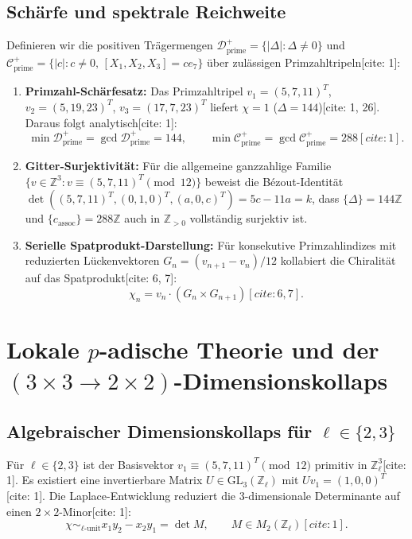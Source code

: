 \documentclass[11pt,a4paper]{article}
\theoremstyle{definition}
\theoremstyle{remark}
\begin{document}
\subsection{Schärfe und spektrale Reichweite}
Definieren wir die positiven Trägermengen $\mathcal{D}_{\mathrm{prime}}^{+} = \{|\Delta| : \Delta \neq 0\}$ und $\mathcal{C}_{\mathrm{prime}}^{+} = \{|c| : c \neq 0, \, [X_1,X_2,X_3]=ce_7\}$ über zulässigen Primzahltripeln[cite: 1]:
\begin{enumerate}
\item \textbf{Primzahl-Schärfesatz:} Das Primzahltripel $v_1=(5,7,11)^T$, $v_2=(5,19,23)^T$, $v_3=(17,7,23)^T$ liefert $\chi = 1$ ($\Delta = 144$)[cite: 1, 26]. Daraus folgt analytisch[cite: 1]:
\begin{equation}
\min \mathcal{D}_{\mathrm{prime}}^{+} = \gcd \mathcal{D}_{\mathrm{prime}}^{+} = 144, \qquad \min \mathcal{C}_{\mathrm{prime}}^{+} = \gcd \mathcal{C}_{\mathrm{prime}}^{+} = 288[cite: 1].
\end{equation}
\item \textbf{Gitter-Surjektivität:} Für die allgemeine ganzzahlige Familie $\{v \in \mathbb{Z}^3 : v \equiv (5,7,11)^T \pmod{12}\}$ beweist die Bézout-Identität $\det((5,7,11)^T, (0,1,0)^T, (a,0,c)^T) = 5c - 11a = k$, dass $\{\Delta\} = 144\mathbb{Z}$ und $\{c_{\mathrm{assoc}}\} = 288\mathbb{Z}$ auch in $\mathbb{Z}_{>0}$ vollständig surjektiv ist.
\item \textbf{Serielle Spatprodukt-Darstellung:} Für konsekutive Primzahlindizes mit reduzierten Lückenvektoren $G_n = (v_{n+1}-v_n)/12$ kollabiert die Chiralität auf das Spatprodukt[cite: 6, 7]:
\begin{equation}
\boxed{\chi_n = v_n \cdot (G_n \times G_{n+1})}[cite: 6, 7].
\end{equation}
\end{enumerate}

\section{Lokale $p$-adische Theorie und der $(3\times 3 \to 2\times 2)$-Dimensionskollaps}

\subsection{Algebraischer Dimensionskollaps für $\ell \in \{2, 3\}$}
Für $\ell \in \{2, 3\}$ ist der Basisvektor $v_1 \equiv (5, 7, 11)^T \pmod{12}$ primitiv in $\mathbb{Z}_\ell^3$[cite: 1]. Es existiert eine invertierbare Matrix $U \in \mathrm{GL}_3(\mathbb{Z}_\ell)$ mit $U v_1 = (1, 0, 0)^T$[cite: 1]. Die Laplace-Entwicklung reduziert die 3-dimensionale Determinante auf einen $2\times 2$-Minor[cite: 1]:
\begin{equation}
\chi \sim_{\ell\text{-unit}} x_1 y_2 - x_2 y_1 = \det M, \qquad M \in M_2(\mathbb{Z}_\ell)[cite: 1].
\end{equation}
\end{document}
